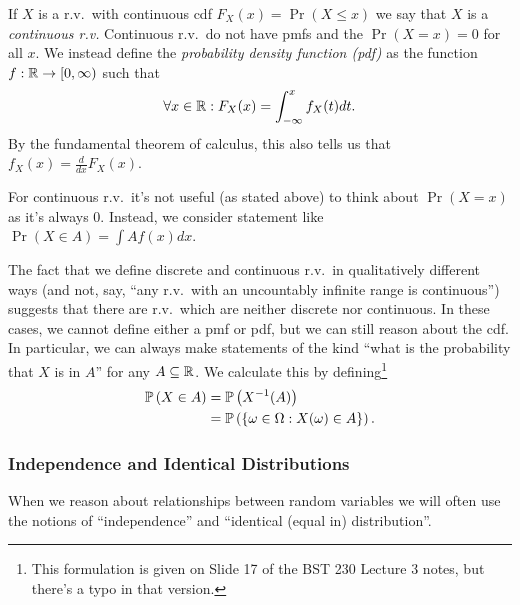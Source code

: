 If $X$ is a r.v.\ with continuous cdf $F_X(x) = \Pr(X \leq x)$ we say that 
$X$ is a \emph{continuous r.v.} Continuous r.v.\ do not have pmfs and the 
$\Pr(X = x) = 0$ for all $x$. We instead define the \emph{probability density function (pdf)}
as the function $f: \mathbb R \rightarrow [0,\infty)$ such that 
\[
    \forall x \in \mathbb R:
    F_X(x) = \int_{-\infty}^{x} f_X(t) dt.
\]
By the fundamental theorem of calculus, this also tells us that 
$f_X(x) = \frac{d}{dx} F_X(x)$.

For continuous r.v.\ it's not useful (as stated above) to think about $\Pr(X = x)$ as it's 
always 0. Instead, we consider statement like $\Pr(X \in A) = \int A f(x) dx$. 

The fact that we define discrete and continuous r.v.\ in qualitatively different ways 
(and not, say, ``any r.v.\ with an uncountably infinite range is continuous'') suggests 
that there are r.v.\ which are neither discrete nor continuous. 
In these cases, we cannot define either a pmf or pdf, but we can still reason about the cdf.
In particular, we can always make statements of the kind ``what is the probability that $X$ 
is in $A$'' for any $A \subseteq \mathbb R$. We calculate this by defining\footnote{This formulation is given on Slide 17 of the 
BST 230 Lecture 3 notes, but there's a typo in that version.}
\begin{align*}
    \operatorname*{\mathbb{P}} \left( X \in A \right)
        &= \operatorname*{\mathbb{P}} \left( X^{-1}(A) \right) \\
        &= \operatorname*{\mathbb{P}} \left( \{\omega \in \Omega: X(\omega) \in A\} \right).
\end{align*}

\subsubsection{Independence and Identical Distributions}
When we reason about relationships between random variables
we will often use the notions of ``independence'' and ``identical (equal in) distribution''.

